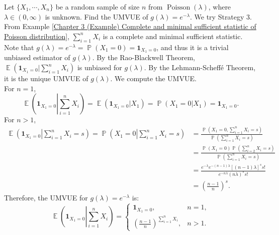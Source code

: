 \documentclass{huhtakm-template-book-v2}
\DeclareMathOperator{\prob}{\mathbb{P}}
\DeclareMathOperator{\E}{\mathbb{E}}
\DeclareMathOperator{\Poisson}{Poisson}
\begin{document}
    \begin{eg}
        Let $\{X_{1},\cdots,X_{n}\}$ be a random sample of size $n$ from $\Poisson(\lambda)$, where $\lambda\in(0,\infty)$ is unknown. Find the UMVUE of $g(\lambda)=e^{-\lambda}$. We try Strategy 3.\\
        From Example \ref{Chapter 3 (Example) Complete and minimal sufficient statistic of Poisson distribution}, $\sum_{i=1}^{n}X_{i}$ is a complete and minimal sufficient statistic. Note that $g(\lambda)=e^{-\lambda}=\prob(X_{1}=0)=\mathbf{1}_{X_{1}=0}$, and thus it is a trivial unbiased estimator of $g(\lambda)$. By the Rao-Blackwell Theorem, $\E(\mathbf{1}_{X_{1}=0}|\sum_{i=1}^{n}X_{i})$ is unbiased for $g(\lambda)$. By the Lehmann-Scheff\'e Theorem, it is the unique UMVUE of $g(\lambda)$. We compute the UMVUE.\\
        For $n=1$,
        \begin{equation*}
            \E\left(\mathbf{1}_{X_{1}=0}\left|\sum_{i=1}^{n}X_{i}\right.\right)=\E(\mathbf{1}_{X_{1}=0}|X_{1})=\prob(X_{1}=0|X_{1})=\mathbf{1}_{X_{1}=0}.
        \end{equation*}
        For $n>1$,
        \begin{align*}
            \E\left(\mathbf{1}_{X_{1}=0}\left|\sum_{i=1}^{n}X_{i}=s\right.\right)=\prob\left(X_{1}=0\left|\sum_{i=1}^{n}X_{i}=s\right.\right)&=\frac{\prob(X_{1}=0,\sum_{i=1}^{n}X_{i}=s)}{\prob(\sum_{i=1}^{n}X_{i}=s)}\\
            &=\frac{\prob(X_{1}=0)\prob(\sum_{i=2}^{n}X_{i}=s)}{\prob(\sum_{i=1}^{n}X_{i}=s)}\\
            &=\frac{e^{-\lambda}e^{-(n-1)\lambda}[(n-1)\lambda]^{s}s!}{e^{-n\lambda}(n\lambda)^{s}s!}\\
            &=\left(\frac{n-1}{n}\right)^{s}.
        \end{align*}
        Therefore, the UMVUE for $g(\lambda)=e^{-\lambda}$ is:
        \begin{equation*}
            \E\left(\mathbf{1}_{X_{1}=0}\left|\sum_{i=1}^{n}X_{i}\right.\right)=\begin{cases}
                \mathbf{1}_{X_{1}=0}, &n=1,\\
                \left(\frac{n-1}{n}\right)^{\sum_{i=1}^{n}X_{i}}, &n>1.
            \end{cases}
        \end{equation*}
    \end{eg}
\end{document}
